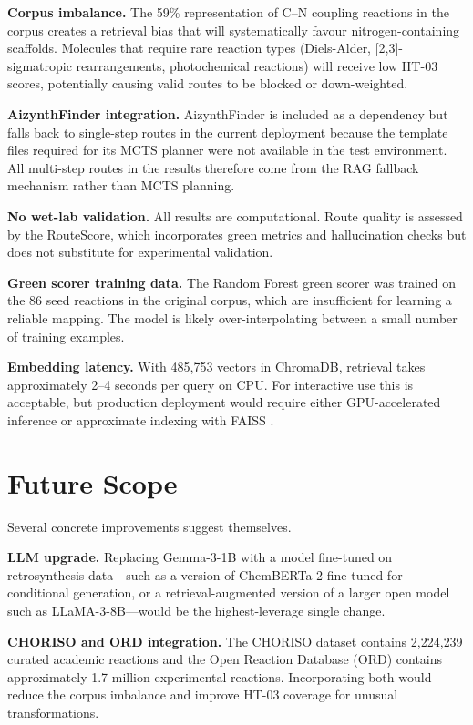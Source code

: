 \documentclass[12pt,a4paper]{article}
\begin{document}
\textbf{Corpus imbalance.} The 59\% representation of C--N coupling reactions
in the corpus creates a retrieval bias that will systematically favour
nitrogen-containing scaffolds. Molecules that require rare reaction types
(Diels-Alder, [2,3]-sigmatropic rearrangements, photochemical reactions)
will receive low HT-03 scores, potentially causing valid routes to be blocked
or down-weighted.

\textbf{AizynthFinder integration.} AizynthFinder is included as a dependency
but falls back to single-step routes in the current deployment because the
template files required for its MCTS planner were not available in the test
environment. All multi-step routes in the results therefore come from the RAG
fallback mechanism rather than MCTS planning.

\textbf{No wet-lab validation.} All results are computational. Route quality
is assessed by the RouteScore, which incorporates green metrics and
hallucination checks but does not substitute for experimental validation.

\textbf{Green scorer training data.} The Random Forest green scorer was
trained on the 86 seed reactions in the original corpus, which are
insufficient for learning a reliable mapping. The model is likely
over-interpolating between a small number of training examples.

\textbf{Embedding latency.} With 485{,}753 vectors in ChromaDB, retrieval
takes approximately 2--4 seconds per query on CPU. For interactive use this
is acceptable, but production deployment would require either GPU-accelerated
inference or approximate indexing with FAISS \cite{johnson2019faiss}.

\section{Future Scope}

Several concrete improvements suggest themselves.

\textbf{LLM upgrade.} Replacing Gemma-3-1B with a model fine-tuned on
retrosynthesis data—such as a version of ChemBERTa-2 \cite{ross2022chemberta2}
fine-tuned for conditional generation, or a retrieval-augmented version of a
larger open model such as LLaMA-3-8B—would be the highest-leverage single
change.

\textbf{CHORISO and ORD integration.} The CHORISO dataset \cite{schwaller2021rxnfp}
contains 2{,}224{,}239 curated academic reactions and the Open Reaction Database
(ORD) contains approximately 1.7 million experimental reactions. Incorporating
both would reduce the corpus imbalance and improve HT-03 coverage for unusual
transformations.
\end{document}
